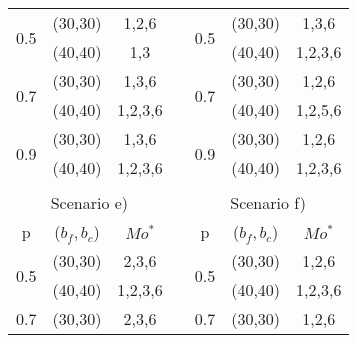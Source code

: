 \begin{table}[]
{\begin{tabular}{ccccccc}
\multicolumn{1}{|c|}{\multirow{2}{*}{0.5}} & \multicolumn{1}{c|}{(30,30)} & \multicolumn{1}{c|}{1,2,6} & \multicolumn{1}{c|}{} & \multicolumn{1}{c|}{\multirow{2}{*}{0.5}} & \multicolumn{1}{c|}{(30,30)} & \multicolumn{1}{c|}{1,3,6} \\ \cline{2-3}
\multicolumn{1}{|c|}{} & \multicolumn{1}{c|}{(40,40)} & \multicolumn{1}{c|}{1,3} & \multicolumn{1}{c|}{} & \multicolumn{1}{c|}{} & \multicolumn{1}{c|}{(40,40)} & \multicolumn{1}{c|}{1,2,3,6} \\ \cline{1-3}
\multicolumn{1}{|c|}{\multirow{2}{*}{0.7}} & \multicolumn{1}{c|}{(30,30)} & \multicolumn{1}{c|}{1,3,6} & \multicolumn{1}{c|}{} & \multicolumn{1}{c|}{\multirow{2}{*}{0.7}} & \multicolumn{1}{c|}{(30,30)} & \multicolumn{1}{c|}{1,2,6} \\ \cline{2-3}
\multicolumn{1}{|c|}{} & \multicolumn{1}{c|}{(40,40)} & \multicolumn{1}{c|}{1,2,3,6} & \multicolumn{1}{c|}{} & \multicolumn{1}{c|}{} & \multicolumn{1}{c|}{(40,40)} & \multicolumn{1}{c|}{1,2,5,6} \\ \cline{1-3}
\multicolumn{1}{|c|}{\multirow{2}{*}{0.9}} & \multicolumn{1}{c|}{(30,30)} & \multicolumn{1}{c|}{1,3,6} & \multicolumn{1}{c|}{} & \multicolumn{1}{c|}{\multirow{2}{*}{0.9}} & \multicolumn{1}{c|}{(30,30)} & \multicolumn{1}{c|}{1,2,6} \\ \cline{2-3}
\multicolumn{1}{|c|}{} & \multicolumn{1}{c|}{(40,40)} & \multicolumn{1}{c|}{1,2,3,6} & \multicolumn{1}{c|}{} & \multicolumn{1}{c|}{} & \multicolumn{1}{c|}{(40,40)} & \multicolumn{1}{c|}{1,2,3,6} \\ \cline{1-3}
 &  &  &  &  &  &  \\
\multicolumn{3}{c}{Scenario e)} &  & \multicolumn{3}{c}{Scenario f)} \\ \cline{1-3}
\multicolumn{1}{|c|}{p} & \multicolumn{1}{c|}{($b_f,b_c$)} & \multicolumn{1}{c|}{$Mo^*$} & \multicolumn{1}{c|}{} & \multicolumn{1}{c|}{p} & \multicolumn{1}{c|}{($b_f,b_c$)} & \multicolumn{1}{c|}{$Mo^*$} \\ \cline{1-3}
\multicolumn{1}{|c|}{\multirow{2}{*}{0.5}} & \multicolumn{1}{c|}{(30,30)} & \multicolumn{1}{c|}{2,3,6} & \multicolumn{1}{c|}{} & \multicolumn{1}{c|}{\multirow{2}{*}{0.5}} & \multicolumn{1}{c|}{(30,30)} & \multicolumn{1}{c|}{1,2,6} \\ \cline{2-3}
\multicolumn{1}{|c|}{} & \multicolumn{1}{c|}{(40,40)} & \multicolumn{1}{c|}{1,2,3,6} & \multicolumn{1}{c|}{} & \multicolumn{1}{c|}{} & \multicolumn{1}{c|}{(40,40)} & \multicolumn{1}{c|}{1,2,3,6} \\ \cline{1-3}
\multicolumn{1}{|c|}{\multirow{2}{*}{0.7}} & \multicolumn{1}{c|}{(30,30)} & \multicolumn{1}{c|}{2,3,6} & \multicolumn{1}{c|}{} & \multicolumn{1}{c|}{\multirow{2}{*}{0.7}} & \multicolumn{1}{c|}{(30,30)} & \multicolumn{1}{c|}{1,2,6} \\ \cline{2-3}

\end{tabular}}
\end{table}
